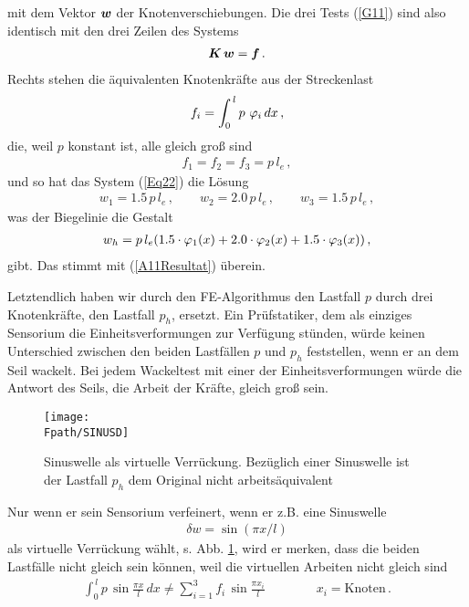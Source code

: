 mit dem Vektor $\mbox{\boldmath $w$}$ der Knotenverschiebungen.
Die drei Tests (\ref{G11}) sind also identisch mit den drei Zeilen des Systems
\begin{align}\label{Eq22}
\mbox{\boldmath $K$}\,\mbox{\boldmath $w$} = \mbox{\boldmath $f$}\,.
\end{align}
Rechts stehen die \"{a}quivalenten Knotenkr\"{a}fte aus der Streckenlast
\begin{align}
 f_i = \int_0^{\,l} p\, \,\varphi_i\, dx\,,
\end{align}
die, weil $p$ konstant ist, alle gleich gro{\ss} sind
\begin{align}
f_1 = f_2 = f_3 = p \, l_{e} \,,
\end{align}
und so hat das System (\ref{Eq22}) die L\"{o}sung
\begin{align}
w_1 = 1.5\, p \, l_{e}\,, \qquad  w_2 = 2.0 \,p \, l_{e}\,, \qquad  w_3 = 1.5 \,p \,
l_{e}\,,
\end{align}
was der Biegelinie die Gestalt
\begin{align}
w_{h} =  p\, l_{e}(1.5 \cdot \varphi_1(x) + 2.0 \cdot \varphi_2(x) + 1.5 \cdot \varphi_3(x)) \,,
\end{align}
gibt. Das stimmt mit (\ref{A11Resultat}) \"{u}berein.


Letztendlich haben wir durch den FE-Algorithmus den Lastfall $p$ durch drei Knotenkr\"{a}fte, den Lastfall $p_h$, ersetzt. Ein Pr\"{u}fstatiker, dem als einziges  Sensorium  die Einheitsverformungen zur Verf\"{u}gung st\"{u}nden, w\"{u}rde keinen Unterschied zwischen den beiden Lastf\"{a}llen $p$ und $p_h$ feststellen, wenn er an dem Seil wackelt. Bei jedem Wackeltest mit einer der Einheitsverformungen w\"{u}rde die Antwort des Seils, die Arbeit der Kr\"{a}fte, gleich gro{\ss} sein.
\begin{figure}[tbp] \centering
\if {} \sidecaption \fi
\texttt{[image: \\Fpath/SINUSD]}
\caption{Sinuswelle als virtuelle Verr\"{u}ckung. Bez\"{u}glich einer Sinuswelle ist der
Lastfall $p_h$ dem Original nicht arbeits\"{a}quivalent} \label{Sinus}
\end{figure}%

Nur wenn er sein  Sensorium verfeinert, wenn er z.B. eine
Sinuswelle
\begin{align}
 \delta w = \sin (\pi x/l)
 \end{align}
als virtuelle Verr\"{u}ckung w\"{a}hlt, s. Abb. \ref{Sinus}, wird er merken, dass die beiden Lastf\"{a}lle nicht gleich
sein k\"{o}nnen, weil die virtuellen Arbeiten nicht gleich sind
\begin{align}
\int_0^{\,l} p \,\sin \frac{\pi x}{l} \,dx \neq \sum_{i = 1}^3 f_i \,\sin \frac{\pi x_i}{l}
\qquad\qquad x_i = \mbox{Knoten}\,.
\end{align}


